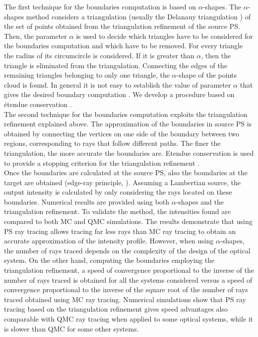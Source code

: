 The first technique for the boundaries computation is based on $\alpha$-shapes. 
The $\alpha$-shapes method considers a triangulation (usually the Delanauy triangulation \cite{marsden2003texts}) of the set of points obtained from the triangulation refinement of the source PS. Then, the parameter $\alpha$ is used to decide which triangles have to be considered for the boundaries computation and which have to be removed. For every triangle the radius of its circumcircle is considered. If it is greater than $\alpha$, then the triangle is eliminated from the triangulation. Connecting the edges of the remaining triangles belonging to only one triangle, the $\alpha$-shape of the points cloud is found. In general it is not easy to establish the value of parameter $\alpha$ that gives the desired boundary computation \cite{teichmann1998surface}. We develop a procedure based on \'{e}tendue conservation \cite{filosa2015new}. \\ \indent The second technique for the boundaries computation exploits the triangulation refinement explained above. The approximation of the boundaries in source PS is obtained by connecting the vertices on one side of the boundary between two regions, corresponding to rays that follow different paths. The finer the triangulation, the more accurate the boundaries are. Etendue conservation is used to provide a stopping criterion for the triangulation refinement \cite{filosa2016ray, filosa2017phase}. \\ \indent  
Once the boundaries are calculated at the source PS, also the boundaries at the target are obtained (edge-ray principle, \cite{Ries:2}). Assuming a Lambertian source, the output intensity is calculated by only considering the rays located on these boundaries. Numerical results are provided using both $\alpha$-shapes and the triangulation refinement. To validate the method, the intensities found are compared to both MC and QMC simulations. The results demonstrate that using PS ray tracing allows tracing far less rays than MC ray tracing to obtain an accurate approximation of the intensity profile. However, when using $\alpha$-shapes, the number of rays traced depends on the complexity of the design of the optical system. On the other hand, computing the boundaries employing the triangulation refinement, a speed of convergence proportional to the inverse of the number of rays traced is obtained for all the systems considered versus a speed of convergence proportional to the inverse of the square root of the number of rays traced obtained using MC ray tracing. Numerical simulations show that PS ray tracing based on the triangulation refinement gives speed advantages also comparable with QMC ray tracing when applied to some optical systems, while it is slower than QMC for some other systems.
